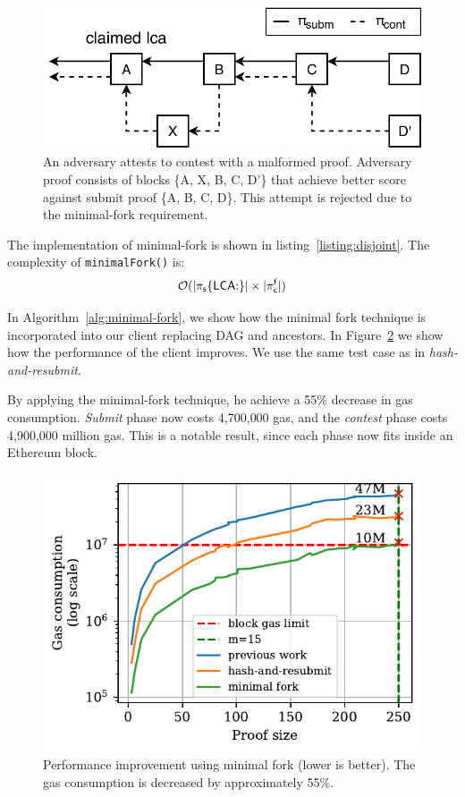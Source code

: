 \begin{figure}[h]
    \begin{center}
        \includegraphics[width=0.5\columnwidth]{figures/adversary-minimal-fork.pdf}
    \end{center}
    \caption{An adversary attests to contest with a malformed proof. Adversary
        proof consists of blocks \{A, X, B, C, D'\} that achieve better score
        against submit proof \{A, B, C, D\}. This attempt is rejected due to
        the minimal-fork requirement.}
    \label{fig:adversary-minimal-fork}
\end{figure}

The implementation of minimal-fork is shown in listing~\ref{listing:disjoint}.
The complexity of \texttt{minimalFork()} is: \[ \mathcal{O}(|\mathsf{\pi_{s}}\{\mathsf{LCA}{:\}}|
\times |\mathsf{\pi_{c}^{f}}|) \]



In Algorithm~\ref{alg:minimal-fork}, we show how the minimal fork technique is
incorporated into our client replacing DAG and ancestors. In
Figure~\ref{fig:minimal-fork} we show how the performance of the client
improves. We use the same test case as in \emph{hash-and-resubmit}.



By applying the minimal-fork technique, he achieve a 55\% decrease in gas
consumption. \emph{Submit} phase now costs {4{,}700{,}000} gas, and
the \emph{contest} phase costs {4{,}900{,}000} million gas. This is a notable
result, since each phase now fits inside an Ethereum block.

\begin{figure}[H]
    \begin{center}
        \includegraphics[width=0.6\columnwidth]{figures/minimal-fork.pdf}
    \end{center}
    \caption{Performance improvement using minimal fork (lower is better). The
        gas consumption is decreased by approximately 55\%.}
    \label{fig:minimal-fork}
\end{figure}

